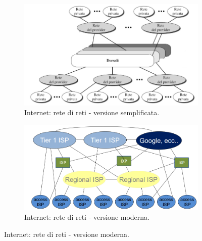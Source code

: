 \documentclass[11pt, italian, openany]{book}
\begin{document}
\begin{sloppypar}
\begin{figure}[h!]
	\begin{subfigure}{0.49 \linewidth} \centering
		\includegraphics[scale=0.28]{images/internet-semplificata.png}
		\caption{Internet: rete di reti - versione semplificata.}
	\end{subfigure}
	\begin{subfigure}{0.49 \linewidth} \centering
		\includegraphics[scale=0.28]{images/internet-completa.png}
		\caption{Internet: rete di reti - versione moderna.}
	\end{subfigure}
\end{figure}


\end{sloppypar}
\end{document}
